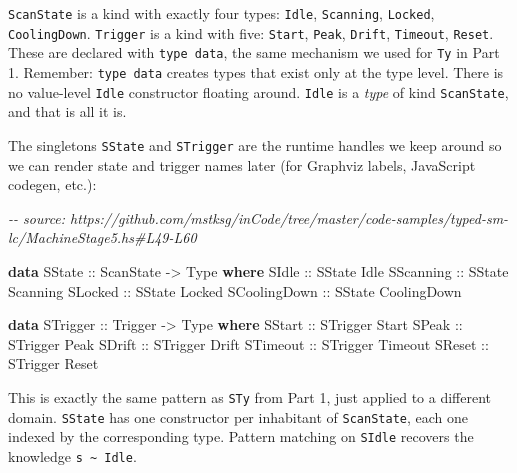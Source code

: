 \documentclass[]{article}
\newenvironment{Shaded}{}{}
\newcommand{\CommentTok}[1]{\textcolor[rgb]{0.38,0.63,0.69}{\textit{#1}}}
\newcommand{\DataTypeTok}[1]{\textcolor[rgb]{0.56,0.13,0.00}{#1}}
\newcommand{\KeywordTok}[1]{\textcolor[rgb]{0.00,0.44,0.13}{\textbf{#1}}}
\newcommand{\OtherTok}[1]{\textcolor[rgb]{0.00,0.44,0.13}{#1}}
\begin{document}
\texttt{ScanState} is a kind with exactly four types: \texttt{Idle},
\texttt{Scanning}, \texttt{Locked}, \texttt{CoolingDown}. \texttt{Trigger} is a
kind with five: \texttt{Start}, \texttt{Peak}, \texttt{Drift}, \texttt{Timeout},
\texttt{Reset}. These are declared with \texttt{type\ data}, the same mechanism
we used for \texttt{Ty} in Part 1. Remember: \texttt{type\ data} creates types
that exist only at the type level. There is no value-level \texttt{Idle}
constructor floating around. \texttt{Idle} is a \emph{type} of kind
\texttt{ScanState}, and that is all it is.

The singletons \texttt{SState} and \texttt{STrigger} are the runtime handles we
keep around so we can render state and trigger names later (for Graphviz labels,
JavaScript codegen, etc.):

\begin{Shaded}
\begin{Highlighting}[]
\CommentTok{{-}{-} source: https://github.com/mstksg/inCode/tree/master/code{-}samples/typed{-}sm{-}lc/MachineStage5.hs\#L49{-}L60}

\KeywordTok{data} \DataTypeTok{SState}\OtherTok{ ::} \DataTypeTok{ScanState} \OtherTok{{-}\textgreater{}} \DataTypeTok{Type} \KeywordTok{where}
  \DataTypeTok{SIdle}\OtherTok{ ::} \DataTypeTok{SState} \DataTypeTok{Idle}
  \DataTypeTok{SScanning}\OtherTok{ ::} \DataTypeTok{SState} \DataTypeTok{Scanning}
  \DataTypeTok{SLocked}\OtherTok{ ::} \DataTypeTok{SState} \DataTypeTok{Locked}
  \DataTypeTok{SCoolingDown}\OtherTok{ ::} \DataTypeTok{SState} \DataTypeTok{CoolingDown}

\KeywordTok{data} \DataTypeTok{STrigger}\OtherTok{ ::} \DataTypeTok{Trigger} \OtherTok{{-}\textgreater{}} \DataTypeTok{Type} \KeywordTok{where}
  \DataTypeTok{SStart}\OtherTok{ ::} \DataTypeTok{STrigger} \DataTypeTok{Start}
  \DataTypeTok{SPeak}\OtherTok{ ::} \DataTypeTok{STrigger} \DataTypeTok{Peak}
  \DataTypeTok{SDrift}\OtherTok{ ::} \DataTypeTok{STrigger} \DataTypeTok{Drift}
  \DataTypeTok{STimeout}\OtherTok{ ::} \DataTypeTok{STrigger} \DataTypeTok{Timeout}
  \DataTypeTok{SReset}\OtherTok{ ::} \DataTypeTok{STrigger} \DataTypeTok{Reset}
\end{Highlighting}
\end{Shaded}

This is exactly the same pattern as \texttt{STy} from Part 1, just applied to a
different domain. \texttt{SState} has one constructor per inhabitant of
\texttt{ScanState}, each one indexed by the corresponding type. Pattern matching
on \texttt{SIdle} recovers the knowledge \texttt{s\ \textasciitilde{}\ Idle}.
\end{document}
